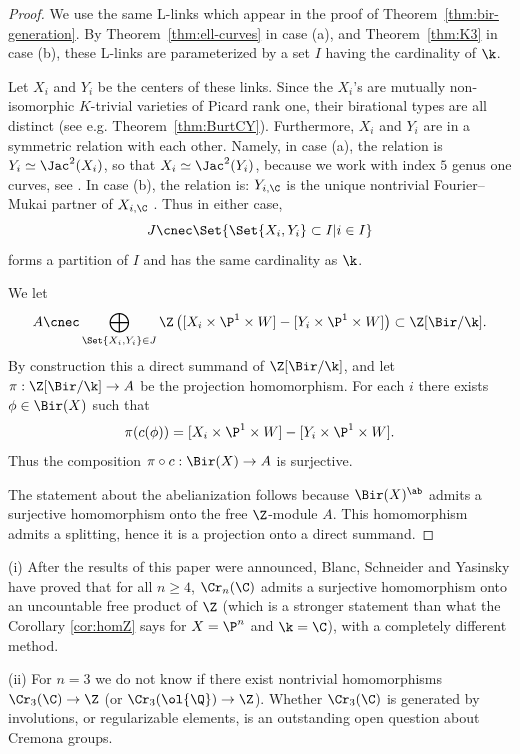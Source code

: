 \begin{proof}
We use the same
L-links which appear in the proof of
Theorem~\ref{thm:bir-generation}.
By Theorem~\ref{thm:ell-curves}
in case (a), and Theorem~\ref{thm:K3}
in case (b),
these L-links are
parameterized by a set $I$ having the cardinality of $\k$.

Let $X_i$ and $Y_i$ be the centers of these links.
Since the $X_i$'s are mutually non-isomorphic $K$-trivial varieties of Picard rank one, their birational types are all distinct (see e.g.
Theorem~\ref{thm:BurtCY}).
Furthermore, $X_i$ and $Y_i$
are in a symmetric relation with each other.
Namely, in case (a), the relation
is $Y_i \simeq \Jac^2(X_i)$,
so that $X_i \simeq \Jac^2(Y_i)$,
because we work with index $5$ genus one curves, see \cite[2.2]{ShinderZhang}.
In case (b), the relation is:
$Y_{i, \C}$ is the
unique nontrivial
Fourier--Mukai partner of $X_{i,\C}$ \cite[3.1]{HassettLai}.
Thus in either case,
$$J \cnec \Set{ \Set{X_i,Y_i} \subset I | i \in I}$$
forms a partition of $I$
and has the same cardinality as $\k$.


We let
$$A \cnec \bigoplus_{\Set{X_i,Y_i} \in J}\Z\left([X_i \times \P^1 \times W] - [Y_i \times \P^1 \times W]\right) \subset
\Z[\Bir/\k].$$
By construction this a direct summand
of $\Z[\Bir/\k]$, and let $\pi: \Z[\Bir/\k] \to A$ be the  projection homomorphism.
For each $i$ there exists
$\phi \in \Bir(X)$ such that $$\pi(c(\phi)) =
[X_i \times \P^1 \times W] - [Y_i \times \P^1 \times W].$$
Thus the composition
$\pi \circ c: \Bir(X) \to A$ is surjective.

The statement about the abelianization follows
because $\Bir(X)^{\ab}$ admits a surjective homomorphism onto the free $\Z$-module $A$.
This homomorphism admits a splitting, hence it is
a projection onto a direct summand.
\end{proof}


\begin{remark}
\notready
(i) After the results of this paper were announced, Blanc, Schneider and Yasinsky have proved that for all $n \ge 4$, $\Cr_n(\C)$
admits a surjective homomorphism onto an uncountable free product of $\Z$
\cite[Theorem B]{BSY} (which is
a stronger statement
than what
the Corollary \ref{cor:homZ} says
for $X = \P^n$ and $\k = \C$), with a completely different method.

(ii) For $n = 3$ we do not know
if there exist nontrivial homomorphisms $\Cr_3(\C) \to \Z$
(or $\Cr_3(\ol{\Q}) \to \Z$).
Whether $\Cr_3(\C)$ is generated by involutions, or regularizable elements, is an
outstanding open
question about Cremona groups.
\end{remark}




\appendix
